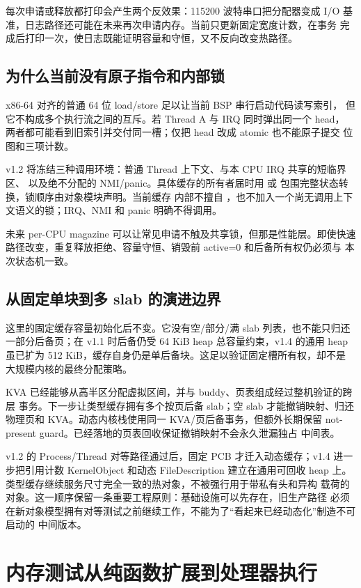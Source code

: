 每次申请或释放都打印会产生两个反效果：115200 波特串口把分配器变成 I/O
基准，日志路径还可能在未来再次申请内存。当前只更新固定宽度计数，在事务
完成后打印一次，使日志既能证明容量和守恒，又不反向改变热路径。

\subsection{为什么当前没有原子指令和内部锁}

x86-64 对齐的普通 64 位 load/store 足以让当前 BSP 串行启动代码读写索引，
但它不构成多个执行流之间的互斥。若 Thread A 与 IRQ 同时弹出同一个 head，
两者都可能看到旧索引并交付同一槽；仅把 head 改成 atomic 也不能原子提交
位图和三项计数。

v1.2 将冻结三种调用环境：普通 Thread 上下文、与本 CPU IRQ 共享的短临界区、
以及绝不分配的 NMI/panic。具体缓存的所有者届时用  或
 包围完整状态转换，锁顺序由对象模块声明。当前缓存
内部不擅自 ，也不加入一个尚无调用上下文语义的锁；IRQ、NMI 和
panic 明确不得调用。

未来 per-CPU magazine 可以让常见申请不触及共享锁，但那是性能层。即使快速
路径改变，重复释放拒绝、容量守恒、销毁前 active=0 和后备所有权仍必须与
本次状态机一致。

\subsection{从固定单块到多 slab 的演进边界}

这里的固定缓存容量初始化后不变。它没有空/部分/满 slab 列表，也不能只归还
一部分后备页；在 v1.1 时后备仍受 64 KiB heap 总容量约束，v1.4 的通用 heap
虽已扩为 512 KiB，缓存自身仍是单后备块。这足以验证固定槽所有权，却不是
大规模内核的最终分配策略。

KVA 已经能够从高半区分配虚拟区间，并与 buddy、页表组成经过整机验证的跨层
事务。下一步让类型缓存拥有多个按页后备 slab；空 slab 才能撤销映射、归还
物理页和 KVA。动态内核栈使用同一 KVA/页后备事务，但额外长期保留
not-present guard。已经落地的页表回收保证撤销映射不会永久泄漏独占
中间表。

v1.2 的 Process/Thread 对等路径通过后，固定 PCB 才迁入动态缓存；v1.4
进一步把引用计数 KernelObject 和动态 FileDescription 建立在通用可回收
heap 上。类型缓存继续服务尺寸完全一致的热对象，不被强行用于带私有头和异构
载荷的对象。这一顺序保留一条重要工程原则：基础设施可以先存在，旧生产路径
必须在新对象模型拥有对等测试之前继续工作，不能为了“看起来已经动态化”制造不可启动的
中间版本。

\section{内存测试从纯函数扩展到处理器执行}


